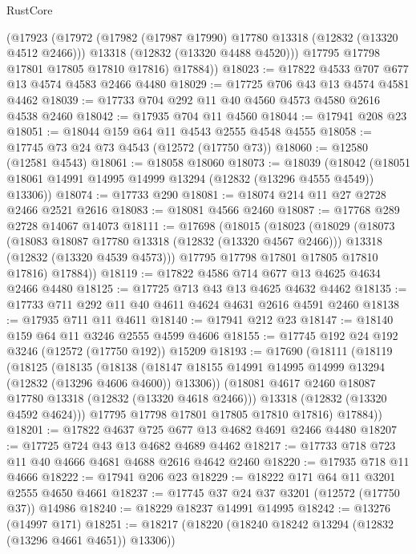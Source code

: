 \begin{lexlean}{RustCore}
\begin{coremodule}
        (@17923
          (@17972
            (@17982 (@17987 @17990) @17780 @13318 (@12832 (@13320 @4512 @2466)))
            @13318
            (@12832 (@13320 @4488 @4520)))
          @17795
          @17798
          @17801
          @17805
          @17810
          @17816)
        @17884))
@18023 := @17822 @4533 @707 @677 @13 @4574 @4583 @2466 @4480
@18029 := @17725 @706 @43 @13 @4574 @4581 @4462
@18039 := @17733 @704 @292 @11 @40 @4560 @4573 @4580 @2616 @4538 @2460
@18042 := @17935 @704 @11 @4560
@18044 := @17941 @208 @23
@18051 := @18044 @159 @64 @11 @4543 @2555 @4548 @4555
@18058 := @17745 @73 @24 @73 @4543 (@12572 (@17750 @73))
@18060 := @12580 (@12581 @4543)
@18061 := @18058 @18060
@18073 := @18039
    (@18042 (@18051 @18061 @14991 @14995 @14999 @13294 (@12832 (@13296 @4555 @4549)) @13306))
@18074 := @17733 @290
@18081 := @18074 @214 @11 @27 @2728 @2466 @2521 @2616
@18083 := @18081 @4566 @2460
@18087 := @17768 @289 @2728 @14067 @14073
@18111 := @17698
    (@18015
      (@18023
        (@18029
          (@18073
            (@18083 @18087 @17780 @13318 (@12832 (@13320 @4567 @2466)))
            @13318
            (@12832 (@13320 @4539 @4573)))
          @17795
          @17798
          @17801
          @17805
          @17810
          @17816)
        @17884))
@18119 := @17822 @4586 @714 @677 @13 @4625 @4634 @2466 @4480
@18125 := @17725 @713 @43 @13 @4625 @4632 @4462
@18135 := @17733 @711 @292 @11 @40 @4611 @4624 @4631 @2616 @4591 @2460
@18138 := @17935 @711 @11 @4611
@18140 := @17941 @212 @23
@18147 := @18140 @159 @64 @11 @3246 @2555 @4599 @4606
@18155 := @17745 @192 @24 @192 @3246 (@12572 (@17750 @192)) @15209
@18193 := @17690
    (@18111
      (@18119
        (@18125
          (@18135
            (@18138
              (@18147 @18155 @14991 @14995 @14999 @13294 (@12832 (@13296 @4606 @4600)) @13306))
            (@18081 @4617 @2460 @18087 @17780 @13318 (@12832 (@13320 @4618 @2466)))
            @13318
            (@12832 (@13320 @4592 @4624)))
          @17795
          @17798
          @17801
          @17805
          @17810
          @17816)
        @17884))
@18201 := @17822 @4637 @725 @677 @13 @4682 @4691 @2466 @4480
@18207 := @17725 @724 @43 @13 @4682 @4689 @4462
@18217 := @17733 @718 @723 @11 @40 @4666 @4681 @4688 @2616 @4642 @2460
@18220 := @17935 @718 @11 @4666
@18222 := @17941 @206 @23
@18229 := @18222 @171 @64 @11 @3201 @2555 @4650 @4661
@18237 := @17745 @37 @24 @37 @3201 (@12572 (@17750 @37)) @14986
@18240 := @18229 @18237 @14991 @14995
@18242 := @13276 (@14997 @171)
@18251 := @18217 (@18220 (@18240 @18242 @13294 (@12832 (@13296 @4661 @4651)) @13306))

\end{coremodule}
\end{lexlean}

